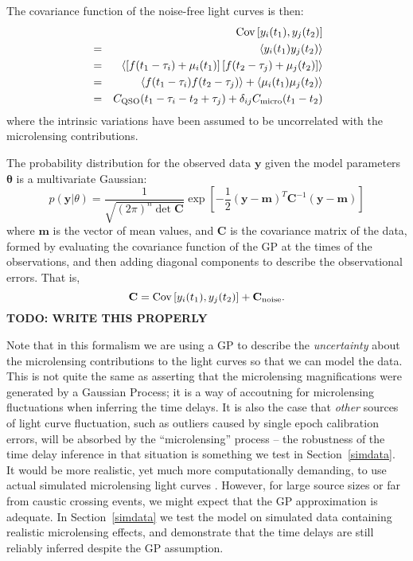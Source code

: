 \documentclass[useAMS,usenatbib, a4paper]{mn2e} \usepackage{natbib}
\begin{document}
The covariance function of the noise-free light curves is then:
\begin{eqnarray}
& & \textnormal{Cov}\left[y_i(t_1), y_j(t_2)\right] \nonumber\\
&=& \left<y_i(t_1)y_j(t_2)\right> \\
&=& \left<\left[f(t_1 - \tau_i) + \mu_i(t_1)\right]\left[f(t_2 - \tau_j) + \mu_j(t_2)\right]\right> \\
&=& \left<f(t_1 - \tau_i)f(t_2 - \tau_j)\right> + \left<\mu_i(t_1)\mu_j(t_2)\right> \\
&=& C_{\rm QSO}(t_1 - \tau_i - t_2 + \tau_j) + \delta_{ij}C_{\rm micro}(t_1 - t_2)
\end{eqnarray}
where the intrinsic variations have been assumed to be uncorrelated with the
microlensing contributions.

The probability distribution for the observed data $\mathbf{y}$ given the
model parameters $\boldsymbol{\theta}$ is a multivariate Gaussian:
\begin{equation}
p(\mathbf{y} | \theta) = \frac{1}{\sqrt{(2\pi)^n \det \mathbf{C}}}
\exp\left[-\frac{1}{2}
(\mathbf{y} - \mathbf{m})^T\mathbf{C}^{-1}(\mathbf{y} - \mathbf{m})\right]
\end{equation}
where $\mathbf{m}$ is the vector of mean values, and $\mathbf{C}$ is the
covariance matrix of the data, formed by evaluating the covariance function of
the GP at the times of the observations, and then adding diagonal components
to describe the observational errors. That is,
\begin{equation}
\mathbf{C} = \textnormal{Cov}\left[y_i(t_1), y_j(t_2)\right] + \mathbf{C}_{\rm noise}.
\end{equation}
{\bf TODO: WRITE THIS PROPERLY}

Note that in this formalism we are using a  GP to describe the {\it
uncertainty} about the microlensing contributions to the light curves so that
we can model the data. This is not quite the same as asserting that the
microlensing magnifications were generated by a Gaussian Process; it is a way
of accoutning for microlensing fluctuations when inferring the time delays. It
is also the case that {\it other} sources of light curve fluctuation, such as
outliers caused by single epoch calibration errors, will be absorbed by the
``microlensing'' process -- the robustness of the time delay inference in that
situation is something we test in Section~\ref{simdata}. It would be more
realistic, yet much more computationally demanding, to use actual simulated
microlensing  light curves \citep{1999JCoAM.109..353W, 2008ApJ...676...80M,
2010NewA...15..181G}. However, for large source sizes or far from caustic
crossing events, we might expect that the GP approximation is adequate. In
Section~\ref{simdata} we test the model on simulated data containing realistic
microlensing effects, and demonstrate that the time delays are still reliably
inferred despite the GP assumption.
\end{document}

